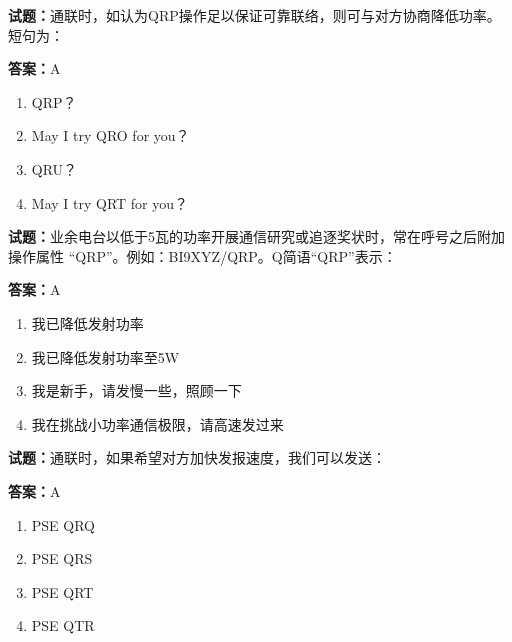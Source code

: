 \documentclass{ctexbook}
\begin{document}




\vspace{1em}

\textbf{试题：}通联时，如认为QRP操作足以保证可靠联络，则可与对方协商降低功率。短句为： 

\textbf{答案：}A 

\begin{enumerate}[leftmargin=3em]
  \item QRP？ 

  \item May I try QRO for you？ 

  \item QRU？ 

  \item May I try QRT for you？ 

\end{enumerate}






\vspace{1em}

\textbf{试题：}业余电台以低于5瓦的功率开展通信研究或追逐奖状时，常在呼号之后附加操作属性
“QRP”。例如：BI9XYZ/QRP。Q简语“QRP”表示： 

\textbf{答案：}A 

\begin{enumerate}[leftmargin=3em]
  \item 我已降低发射功率 

  \item 我已降低发射功率至5W 

  \item 我是新手，请发慢一些，照顾一下 

  \item 我在挑战小功率通信极限，请高速发过来 

\end{enumerate}





\vspace{1em}

\textbf{试题：}通联时，如果希望对方加快发报速度，我们可以发送： 

\textbf{答案：}A 

\begin{enumerate}[leftmargin=3em]
  \item PSE QRQ 

  \item PSE QRS 

  \item PSE QRT 

  \item PSE QTR 

\end{enumerate}
\end{document}
